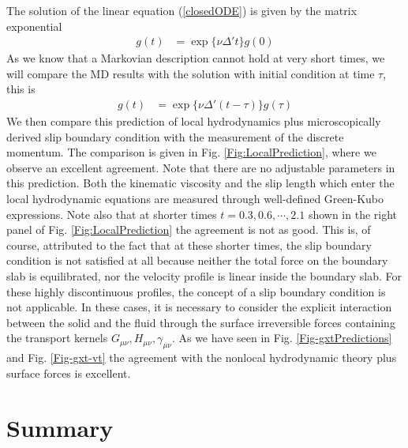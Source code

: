 \documentclass[b5paper,openright,10pt]{book}
\begin{document}
The solution of the linear equation (\ref{closedODE}) is given by the matrix exponential
\begin{align}
 g(t)&=\exp\{\nu \Delta' t\}g(0)
\end{align}
As we know that a Markovian description cannot hold at very short times,
we will compare the MD results with the solution with initial condition
at time $\tau$, this is
\begin{align}
 g(t)&=\exp\{\nu \Delta' (t-\tau)\}g(\tau)
\label{LocPred}
\end{align}
We  then   compare  this   prediction  of  local   hydrodynamics  plus
microscopically derived  slip boundary condition with  the measurement
of  the   discrete  momentum.   The   comparison  is  given   in  Fig.
\ref{Fig:LocalPrediction},  where we  observe  an excellent  agreement.
Note that there are no  adjustable parameters in this prediction. Both
the kinematic viscosity and the slip  length which enter the local hydrodynamic equations are
measured through well-defined Green-Kubo  expressions.  Note also that
at shorter times  $t=0.3,0.6,\cdots,2.1$ shown in the  right panel of
Fig.  \ref{Fig:LocalPrediction} the agreement is not as good. This is,
of course,  attributed to the  fact that  at these shorter  times, the
slip boundary  condition is not  satisfied at all because  neither the
total force  on the  boundary slab is  equilibrated, nor  the velocity
profile  is  linear  inside  the  boundary  slab.   For  these  highly
discontinuous profiles, the concept of a slip boundary condition is not
applicable.   In these cases,  it is necessary to  consider the
explicit  interaction between  the  solid and  the  fluid through  the
surface   irreversible  forces   containing   the  transport   kernels
$G_{\mu\nu},H_{\mu\nu},\gamma_{\mu\nu}$.    As   we   have   seen   in
Fig. \ref{Fig-gxtPredictions} and Fig. \ref{Fig-gxt-vt}  the agreement  with the  nonlocal hydrodynamic
theory plus surface forces is excellent.


\section{Summary}
\end{document}
